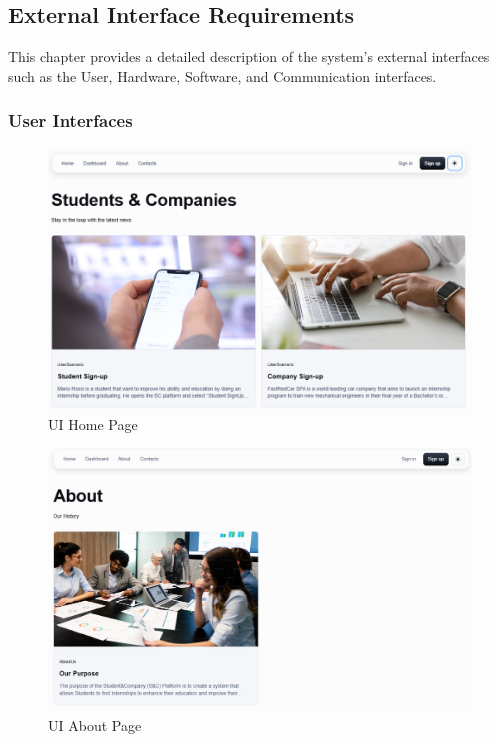 \subsection{External Interface Requirements}
This chapter provides a detailed description of the system's external interfaces such as the User, Hardware, Software, and Communication interfaces. 
\subsubsection{User Interfaces}
\begin{figure}[H]
    \centering
    \includegraphics[width=\textwidth]{Latex/Images/HomePage.png}
    \caption{UI Home Page}
    \label{fig:homepage}
\end{figure}
\clearpage
\begin{figure}[H]
    \centering
    \includegraphics[width=\textwidth]{Latex/Images/AboutPage.png}
    \caption{UI About Page}
    \label{fig:aboutpage}
\end{figure}
